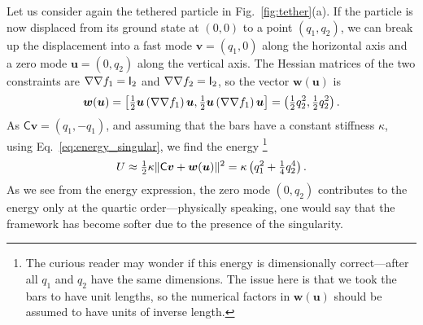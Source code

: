 \begin{example*}
  Let us consider again the tethered particle in Fig.~\ref{fig:tether}(a).
  If the particle is now displaced from its ground state at $(0, 0)$ to a point $(q_{1},q_{2})$, we can break up the displacement into a fast mode $\bm{v} = (q_{1}, 0)$ along the horizontal axis and a zero mode $\bm{u} = (0, q_{2})$ along the vertical axis.
  The Hessian matrices of the two constraints are $\nabla\nabla f_{1} = \mathsf{I}_{2}$ and $\nabla\nabla f_{2} = \mathsf{I}_{2}$, so the vector $\bm{w}(\bm{u})$ is
  \begin{equation}
      \bm{w}(\bm{u}) = \left[\tfrac{1}{2}\bm{u}\left(\nabla\nabla f_{1}\right)\bm{u}, \tfrac{1}{2}\bm{u}\left(\nabla\nabla f_{1}\right)\bm{u}\right]
                     = \left(\tfrac{1}{2}q_{2}^{2}, \tfrac{1}{2}q_{2}^{2}\right).
  \end{equation}
  As $\mathsf{C}\bm{v} = (q_{1}, -q_{1})$, and assuming that the bars have a constant stiffness $\kappa$, using Eq.~\eqref{eq:energy_singular}, we find the energy%
  \footnote{The curious reader may wonder if this energy is dimensionally correct---after all $q_{1}$ and $q_{2}$ have the same dimensions.
  The issue here is that we took the bars to have unit lengths, so the numerical factors in $\bm{w}(\bm{u})$ should be assumed to have units of inverse length.}
  \begin{equation}
    U \approx \tfrac{1}{2}\kappa\lVert\mathsf{C}\bm{v} + \bm{w}(\bm{u})\rVert^{2} = \kappa\left(q_{1}^{2} + \tfrac{1}{4}q_{2}^{4}\right).
  \end{equation}
  As we see from the energy expression, the zero mode $(0, q_{2})$ contributes to the energy only at the quartic order---physically speaking, one would say that the framework has become softer due to the presence of the singularity.
\end{example*}

